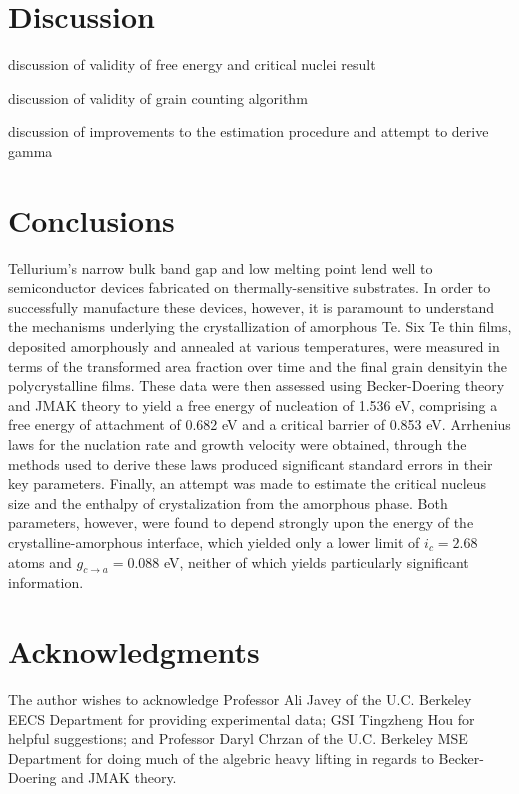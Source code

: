 \documentclass[12pt, titlepage]{article}
\begin{document}


\section{Discussion}

discussion of validity of free energy and critical nuclei result

discussion of validity of grain counting algorithm

discussion of improvements to the estimation procedure and attempt to derive gamma



\section{Conclusions}

Tellurium's narrow bulk band gap and low melting point lend well to semiconductor devices fabricated on thermally-sensitive substrates.  In order to successfully manufacture these devices, however, it is paramount to understand the mechanisms underlying the crystallization of amorphous Te.  Six Te thin films, deposited amorphously and annealed at various temperatures, were measured in terms of the transformed area fraction over time and the final grain densityin the polycrystalline films.  These data were then assessed using Becker-Doering theory and JMAK theory to yield a free energy of nucleation of 1.536 eV, comprising a free energy of attachment of 0.682 eV and a critical barrier of 0.853 eV.  Arrhenius laws for the nuclation rate and growth velocity were obtained, through the methods used to derive these laws produced significant standard errors in their key parameters.  Finally, an attempt was made to estimate the critical nucleus size and the enthalpy of crystalization from the amorphous phase.  Both parameters, however, were found to depend strongly upon the energy of the crystalline-amorphous interface, which yielded only a lower limit of $i_c = 2.68$ atoms and $g_{c \rightarrow a} = 0.088$ eV, neither of which yields particularly significant information.

\section{Acknowledgments}

The author wishes to acknowledge Professor Ali Javey of the U.C. Berkeley EECS Department for providing experimental data; GSI Tingzheng Hou for helpful suggestions; and Professor Daryl Chrzan of the U.C. Berkeley MSE Department for doing much of the algebric heavy lifting in regards to Becker-Doering and JMAK theory.
\end{document}

